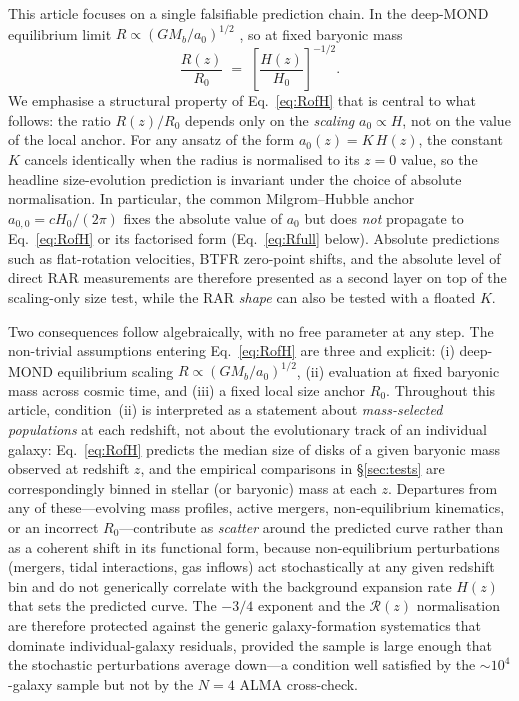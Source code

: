 \documentclass[twocolumn,letterpaper]{aastex631}
\newcommand{\azero}{a_0}
\newcommand{\azerolocal}{a_{0,0}}
\begin{document}
This article focuses on a single falsifiable prediction chain.
In the deep-MOND equilibrium limit
$R\propto(GM_b/\azero)^{1/2}$ \citep{Milgrom1983,FamaeyMcGaugh2012},
so at fixed baryonic mass
\begin{equation}\label{eq:RofH}
  \frac{R(z)}{R_{0}}\;=\;\left[\frac{H(z)}{H_{0}}\right]^{-1/2}.
\end{equation}
We emphasise a structural property of Eq.~\ref{eq:RofH} that is
central to what follows: the ratio $R(z)/R_{0}$ depends only on
the \emph{scaling} $\azero\propto H$, not on the value of the
local anchor.  For any ansatz of the form
$\azero(z)=K\,H(z)$, the constant $K$ cancels identically when
the radius is normalised to its $z=0$ value, so the headline
size-evolution prediction is invariant under the choice of
absolute normalisation.  In particular, the common
Milgrom--Hubble anchor $\azerolocal=cH_{0}/(2\pi)$ fixes the
absolute value of $\azero$ but does \emph{not} propagate to
Eq.~\ref{eq:RofH} or its factorised form (Eq.~\ref{eq:Rfull}
below).  Absolute predictions such as flat-rotation velocities,
BTFR zero-point shifts, and the absolute level of direct RAR
measurements are therefore presented as a second layer on top of
the scaling-only size test, while the RAR \emph{shape} can also
be tested with a floated $K$.

Two consequences follow algebraically, with no free parameter at
any step.  The non-trivial assumptions entering Eq.~\ref{eq:RofH}
are three and explicit: (i) deep-MOND equilibrium scaling
$R\propto(GM_b/\azero)^{1/2}$, (ii) evaluation at fixed
baryonic mass across cosmic time, and (iii) a fixed local
size anchor $R_{0}$.  Throughout this article, condition~(ii) is
interpreted as a statement about \emph{mass-selected populations}
at each redshift, not about the evolutionary track of an
individual galaxy: Eq.~\ref{eq:RofH} predicts the median size of
disks of a given baryonic mass observed at redshift $z$, and the
empirical comparisons in \S\ref{sec:tests} are correspondingly
binned in stellar (or baryonic) mass at each $z$.  Departures
from any of these---evolving
mass profiles, active mergers, non-equilibrium kinematics, or
an incorrect $R_{0}$---contribute as \emph{scatter} around the
predicted curve rather than as a coherent shift in its functional
form, because non-equilibrium perturbations (mergers, tidal
interactions, gas inflows) act stochastically at any given redshift
bin and do not generically correlate with the background expansion
rate $H(z)$ that sets the predicted curve.  The
$-3/4$ exponent and the $\mathcal{R}(z)$ normalisation are
therefore protected against the generic galaxy-formation
systematics that dominate individual-galaxy residuals, provided
the sample is large enough that the stochastic perturbations
average down---a condition well satisfied by the
$\sim 10^{4}$-galaxy \citet{vanderWel2014} sample but not by the
$N\!=\!4$ ALMA cross-check.
\end{document}
